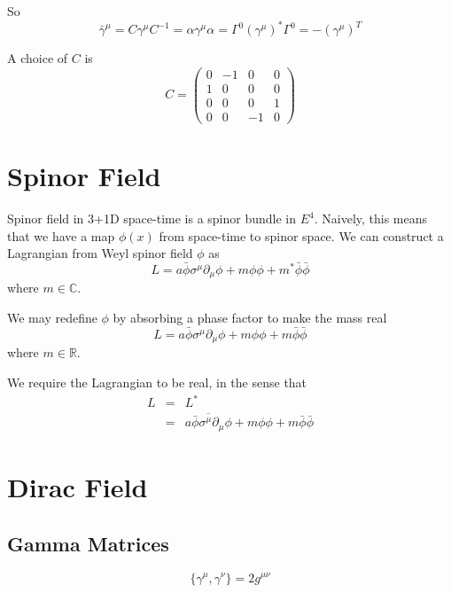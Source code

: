 \documentclass[12pt]{book}
\begin{document}
	So
	\begin{equation}
		\bar\gamma^\mu=C\gamma^\mu C^{-1}=\alpha\gamma^\mu\alpha=\Gamma^0(\gamma^\mu)^*\Gamma^0=-(\gamma^\mu)^T
	\end{equation}
	
	A choice of $C$ is 
	\begin{equation}
		C=\begin{pmatrix}
			0&-1&0&0\\
			1&0&0&0\\
			0&0&0&1\\
			0&0&-1&0
		\end{pmatrix}
	\end{equation}
	
	\section{Spinor Field}
	
	Spinor field in 3+1D space-time is a spinor bundle in $E^4$. Naively, this means that we have a map $\phi(x)$ from space-time to spinor space. We can construct a Lagrangian from Weyl spinor field $\phi$ as
	\begin{equation}
		L=a\bar\phi\sigma^\mu\partial_\mu\phi+m\phi\phi+m^*\bar\phi\bar\phi
	\end{equation}
	where $m\in \mathbb C$.
	
	We may redefine $\phi$ by absorbing a phase factor to make the mass real
	\begin{equation}
		L=a\bar\phi\sigma^\mu\partial_\mu\phi+m\phi\phi+m\bar\phi\bar\phi
	\end{equation}
	where $m\in \mathbb R$.
	
	We require the Lagrangian to be real, in the sense that
	\begin{eqnarray}
		L&=&L^*\\
		&=&\overline{a\bar\phi\sigma^\mu\partial_\mu\phi}+m\phi\phi+m\bar\phi\bar\phi
	\end{eqnarray}

\section{Dirac Field}
\subsection{Gamma Matrices}
\begin{equation}
	\{\gamma^\mu,\gamma^\nu\}=2g^{\mu\nu}
\end{equation}
\end{document}
